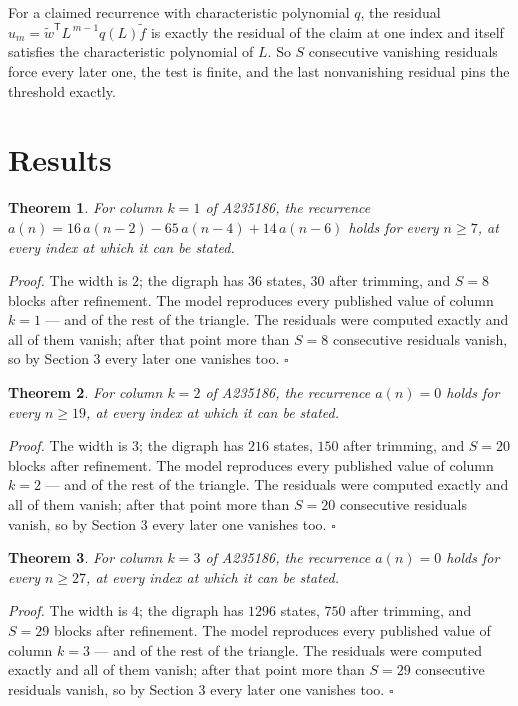 \documentclass[11pt]{article}
\newtheorem{theorem}{Theorem}
\theoremstyle{definition}
\begin{document}
For a claimed recurrence with characteristic polynomial $q$, the residual $u_m = \tilde w^{\mathsf T}L^{\,m-1}q(L)\tilde f$ is exactly the residual of the claim at one index and itself satisfies the characteristic polynomial of $L$. So $S$ consecutive vanishing residuals force every later one, the test is finite, and the last nonvanishing residual pins the threshold exactly.

\section{Results}

\begin{theorem} For column $k = 1$ of A235186, the recurrence $a(n) = 16\,a(n-2) - 65\,a(n-4) + 14\,a(n-6)$ holds for every $n \ge 7$, at every index at which it can be stated.\end{theorem}

{\itshape Proof.} The width is $2$; the digraph has $36$ states, $30$ after trimming, and $S = 8$ blocks after refinement. The model reproduces every published value of column $k = 1$ --- and of the rest of the triangle. The residuals were computed exactly and all of them vanish; after that point more than $S = 8$ consecutive residuals vanish, so by Section 3 every later one vanishes too. $\square$

\begin{theorem} For column $k = 2$ of A235186, the recurrence $a(n) = 0$ holds for every $n \ge 19$, at every index at which it can be stated.\end{theorem}

{\itshape Proof.} The width is $3$; the digraph has $216$ states, $150$ after trimming, and $S = 20$ blocks after refinement. The model reproduces every published value of column $k = 2$ --- and of the rest of the triangle. The residuals were computed exactly and all of them vanish; after that point more than $S = 20$ consecutive residuals vanish, so by Section 3 every later one vanishes too. $\square$

\begin{theorem} For column $k = 3$ of A235186, the recurrence $a(n) = 0$ holds for every $n \ge 27$, at every index at which it can be stated.\end{theorem}

{\itshape Proof.} The width is $4$; the digraph has $1296$ states, $750$ after trimming, and $S = 29$ blocks after refinement. The model reproduces every published value of column $k = 3$ --- and of the rest of the triangle. The residuals were computed exactly and all of them vanish; after that point more than $S = 29$ consecutive residuals vanish, so by Section 3 every later one vanishes too. $\square$
\end{document}
